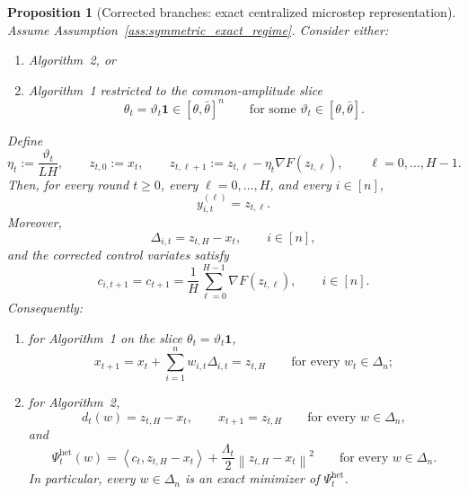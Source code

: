 \documentclass{article}
\newtheorem{proposition}[theorem]{Proposition}
\theoremstyle{definition}
\newcommand{\norm}[1]{\left\lVert #1\right\rVert}
\newcommand{\ip}[2]{\left\langle #1,#2\right\rangle}
\newcommand{\one}{\mathbf 1}
\begin{document}
\begin{proposition}[Corrected branches: exact centralized microstep representation]
\label{prop:corrected_exact_microsteps}
Assume Assumption~\ref{ass:symmetric_exact_regime}. Consider either:
\begin{enumerate}[label=(\alph*)]
    \item Algorithm~2, or
    \item Algorithm~1 restricted to the common-amplitude slice
    \[
    \theta_t = \vartheta_t \one \in [\theta,\bar\theta]^n
    \qquad \text{for some } \vartheta_t \in [\theta,\bar\theta].
    \]
\end{enumerate}
Define
\[
\eta_t := \frac{\vartheta_t}{LH},
\qquad
z_{t,0} := x_t,
\qquad
z_{t,\ell+1} := z_{t,\ell} - \eta_t \nabla F(z_{t,\ell}),
\qquad \ell = 0,\dots,H-1.
\]
Then, for every round $t \ge 0$, every $\ell = 0,\dots,H$, and every $i \in [n]$,
\[
y_{i,t}^{(\ell)} = z_{t,\ell}.
\]
Moreover,
\[
\Delta_{i,t} = z_{t,H} - x_t,
\qquad i \in [n],
\]
and the corrected control variates satisfy
\[
c_{i,t+1} = c_{t+1} = \frac1H \sum_{\ell=0}^{H-1} \nabla F(z_{t,\ell}),
\qquad i \in [n].
\]
Consequently:
\begin{enumerate}[label=(\roman*)]
    \item for Algorithm~1 on the slice $\theta_t=\vartheta_t\one$,
    \[
    x_{t+1} = x_t + \sum_{i=1}^n w_{i,t}\Delta_{i,t} = z_{t,H}
    \qquad \text{for every } w_t \in \Delta_n;
    \]
    \item for Algorithm~2,
    \[
    d_t(w) = z_{t,H} - x_t,
    \qquad
    x_{t+1} = z_{t,H}
    \qquad \text{for every } w \in \Delta_n,
    \]
    and
    \[
    \Psi_t^{\mathrm{het}}(w)
    =
    \ip{c_t}{z_{t,H}-x_t}
    +
    \frac{\Lambda_t}{2}\norm{z_{t,H}-x_t}^2
    \qquad \text{for every } w \in \Delta_n.
    \]
    In particular, every $w \in \Delta_n$ is an exact minimizer of $\Psi_t^{\mathrm{het}}$.
\end{enumerate}
\end{proposition}
\end{document}
